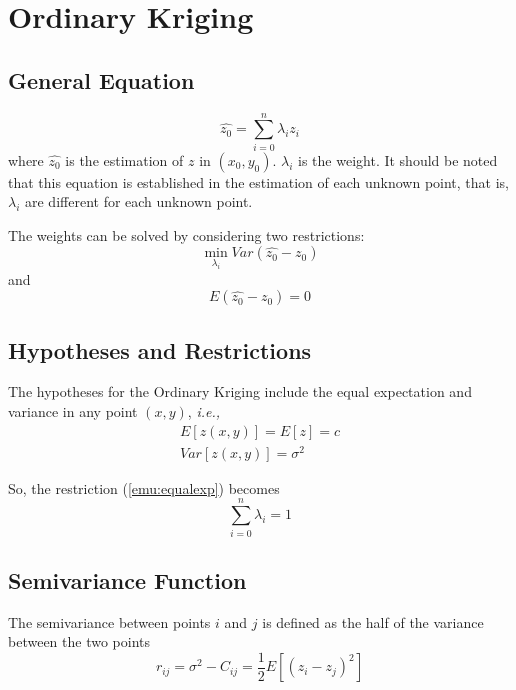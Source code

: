 \documentclass{article}
\begin{document}
\section{Ordinary Kriging}

\subsection{General Equation}
\begin{equation}
\label{emu:ok}
    \hat{z_0}=\sum_{i=0}^{n}\lambda_iz_i
\end{equation}
where $\hat{z_0}$ is the estimation of $z$ in $(x_0, y_0)$. $\lambda_i$ is the weight. It should be noted that this equation is established in the estimation of each unknown point, that is, $\lambda_i$ are different for each unknown point.

The weights can be solved by considering two restrictions:
\begin{equation}
\label{emu:res2}
    \min\limits_{\lambda_i}Var(\hat{z_0}-z_0)
\end{equation}
and 
\begin{equation}
\label{emu:equalexp}
    E(\hat{z_0}-z_0)=0
\end{equation}

\subsection{Hypotheses and Restrictions}
The hypotheses for the Ordinary Kriging include the equal expectation and variance in any point $(x,y)$, \textit{i.e.,}
\begin{align}
    E[z(x,y)]=E[z]=c\\
    Var[z(x,y)]=\sigma^2
\end{align}

So, the restriction (\ref{emu:equalexp}) becomes
\begin{equation}
\label{emu:res1}
    \sum_{i=0}^n\lambda_i=1
\end{equation}

\subsection{Semivariance Function}
The semivariance between points $i$ and $j$ is defined as the half of the variance between the two points
\begin{equation}
    r_{ij}=\sigma^2-C_{ij}=\frac{1}{2}E[(z_i-z_j)^2]
\end{equation}
\end{document}
